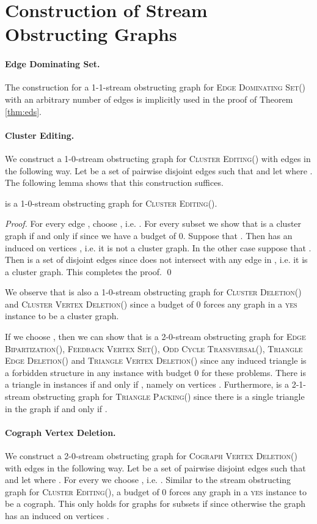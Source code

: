 \documentclass[draft,a4paper]{llncs}
\newcommand{\yes}{\textsc{yes}\xspace}
\newcommand{\EDSk}{\textsc{Edge Dominating Set()}\xspace}
\newcommand{\CEk}{\textsc{Cluster Editing()}\xspace}
\newcommand{\FBVSk}{\textsc{Feedback Vertex Set()}\xspace}
\newcommand{\OCTk}{\textsc{Odd Cycle Transversal()}\xspace}
\newcommand{\CVDk}{\textsc{Cluster Vertex Deletion()}\xspace}
\newcommand{\CEDk}{\textsc{Cluster Deletion()}\xspace}
\newcommand{\BERk}{\textsc{Edge Bipartization()}\xspace}
\newcommand{\CoVDk}{\textsc{Cograph Vertex Deletion()}\xspace}
\newcommand{\TEDk}{\textsc{Triangle Edge Deletion()}\xspace}
\newcommand{\TVDk}{\textsc{Triangle Vertex Deletion()}\xspace}
\newcommand{\TPk}{\textsc{Triangle Packing()}\xspace}
\begin{document}
\section{Construction of Stream Obstructing Graphs} \label{app:list}
\paragraph{Edge Dominating Set.} The construction for a 1-1-stream obstructing graph for \EDSk with an arbitrary number of edges is implicitly used in the proof of Theorem \ref{thm:eds}.

\paragraph{Cluster Editing.} We construct a 1-0-stream obstructing graph  for \CEk with  edges in the following way.
Let  be a set of pairwise disjoint edges such that  and let  where . The following lemma shows that this construction suffices.

\begin{lemma}
 is a 1-0-stream obstructing graph for \CEk. 
\end{lemma}

\begin{proof}
For every edge , choose , i.e. . For every subset  we show that  is a cluster graph if and only if  since we have a budget of 0. Suppose that . Then  has an induced  on vertices , i.e. it is not a cluster graph. In the other case suppose that . Then  is a set of  disjoint edges since  does not intersect with any edge in , i.e. it is a cluster graph. This completes the proof. \qed
\end{proof}

We observe that  is also a 1-0-stream obstructing graph for \CEDk and \CVDk since a budget of 0 forces any graph in a \yes instance to be a cluster graph.

If we choose , then we can show that  is a 2-0-stream obstructing graph for \BERk, \FBVSk, \OCTk, \TEDk and \TVDk since any induced triangle is a forbidden structure in any instance with budget 0 for these problems. There is a triangle in instances  if and only if , namely on vertices . Furthermore,  is a 2-1-stream obstructing graph for \TPk since there is a single triangle in the graph if and only if .

\paragraph{Cograph Vertex Deletion.} We construct a 2-0-stream obstructing graph  for \CoVDk with  edges in the following way. Let  be a set of pairwise disjoint edges such that  and let  where . For every  we choose , i.e. . Similar to the stream obstructing graph for \CEk, a budget of 0 forces any graph in a \yes instance to be a cograph. This only holds for graphs  for subsets  if  since otherwise the graph has an induced  on vertices .
\end{document}
